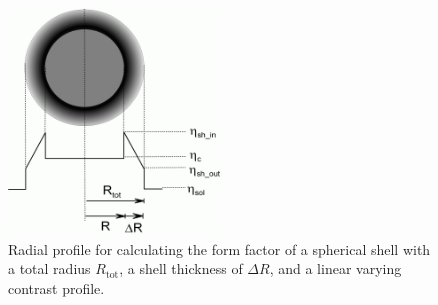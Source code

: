 \begin{figure}[htb]
\begin{center}
\includegraphics[width=0.5\textwidth,height=0.533\textwidth]{../images/form_factor/spheres/linshell2.png}
\end{center}
\caption{Radial profile for calculating the form factor of a spherical shell with a total
radius $R_\text{tot}$, a shell thickness of $\Delta R$, and a linear varying contrast
profile.} \label{LinShell2Profile}
\end{figure}

